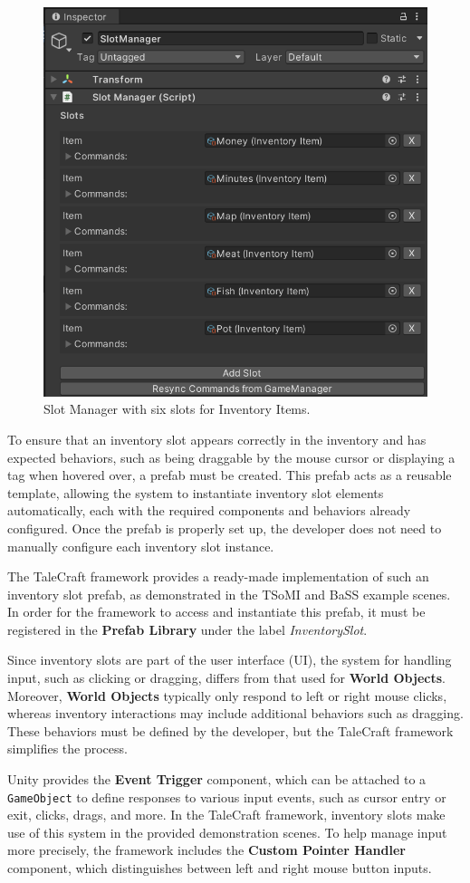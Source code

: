 \begin{figure}[H]
\centering
\includegraphics[width=.7\linewidth]{img/image_2025-07-05_133040354.png}
\caption{Slot Manager with six slots for Inventory Items.}
\label{fig:Manual-SM}
\end{figure}

To ensure that an inventory slot appears correctly in the inventory and has expected behaviors, such as being draggable by the mouse cursor or displaying a tag when hovered over, a prefab must be created. This prefab acts as a reusable template, allowing the system to instantiate inventory slot elements automatically, each with the required components and behaviors already configured. Once the prefab is properly set up, the developer does not need to manually configure each inventory slot instance.

The TaleCraft framework provides a ready-made implementation of such an inventory slot prefab, as demonstrated in the TSoMI and BaSS example scenes. In order for the framework to access and instantiate this prefab, it must be registered in the \textbf{Prefab Library} under the label \textit{InventorySlot}.

Since inventory slots are part of the user interface (UI), the system for handling input, such as clicking or dragging, differs from that used for \textbf{World Objects}. Moreover, \textbf{World Objects} typically only respond to left or right mouse clicks, whereas inventory interactions may include additional behaviors such as dragging. These behaviors must be defined by the developer, but the TaleCraft framework simplifies the process.

Unity provides the \textbf{Event Trigger} component, which can be attached to a \verb|GameObject| to define responses to various input events, such as cursor entry or exit, clicks, drags, and more. In the TaleCraft framework, inventory slots make use of this system in the provided demonstration scenes. To help manage input more precisely, the framework includes the \textbf{Custom Pointer Handler} component, which distinguishes between left and right mouse button inputs.

